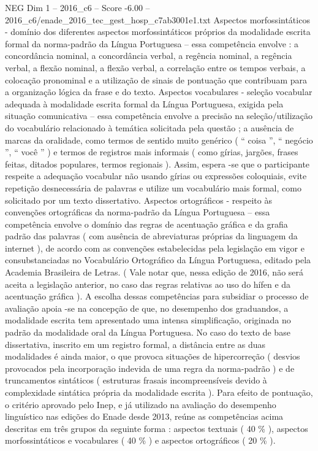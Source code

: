 \begin{textsample}{NEG Dim 1 – 2016\_c6 – Score -6.00 – 2016\_c6/enade\_2016\_tec\_gest\_hosp\_c7ab3001e1.txt}
Aspectos morfossintáticos - domínio dos diferentes aspectos morfossintáticos próprios da modalidade escrita formal da norma-padrão da Língua Portuguesa – essa competência envolve : a concordância nominal, a concordância verbal, a regência nominal, a regência verbal, a flexão nominal, a flexão verbal, a correlação entre os tempos verbais, a colocação pronominal e a utilização de sinais de pontuação que contribuam para a organização lógica da frase e do texto.
Aspectos vocabulares - seleção vocabular adequada à modalidade escrita formal da Língua Portuguesa, exigida pela situação comunicativa – essa competência envolve a precisão na seleção/utilização do vocabulário relacionado à temática solicitada pela questão ; a ausência de marcas da oralidade, como termos de sentido muito genérico ( “ coisa ”, “ negócio ”, “ você ” ) e termos de registros mais informais ( como gírias, jargões, frases feitas, ditados populares, termos regionais ).
Assim, espera -se que o participante respeite a adequação vocabular não usando gírias ou expressões coloquiais, evite repetição desnecessária de palavras e utilize um vocabulário mais formal, como solicitado por um texto dissertativo.
Aspectos ortográficos - respeito às convenções ortográficas da norma-padrão da Língua Portuguesa – essa competência envolve o domínio das regras de acentuação gráfica e da grafia padrão das palavras ( com ausência de abreviaturas próprias da linguagem da internet ), de acordo com as convenções estabelecidas pela legislação em vigor e consubstanciadas no Vocabulário Ortográfico da Língua Portuguesa, editado pela Academia Brasileira de Letras. ( Vale notar que, nessa edição de 2016, não será aceita a legislação anterior, no caso das regras relativas ao uso do hífen e da acentuação gráfica ).
A escolha dessas competências para subsidiar o processo de avaliação apoia -se na concepção de que, no desempenho dos graduandos, a modalidade escrita tem apresentado uma intensa simplificação, originada no padrão da modalidade oral da Língua Portuguesa.
No caso do texto de base dissertativa, inscrito em um registro formal, a distância entre as duas modalidades é ainda maior, o que provoca situações de hipercorreção ( desvios provocados pela incorporação indevida de uma regra da norma-padrão ) e de truncamentos sintáticos ( estruturas frasais incompreensíveis devido à complexidade sintática própria da modalidade escrita ).
Para efeito de pontuação, o critério aprovado pelo Inep, e já utilizado na avaliação do desempenho linguístico nas edições do Enade desde 2013, reúne as competências acima descritas em três grupos da seguinte forma : aspectos textuais ( 40 \% ), aspectos morfossintáticos e vocabulares ( 40 \% ) e aspectos ortográficos ( 20 \% ).

\end{textsample}
